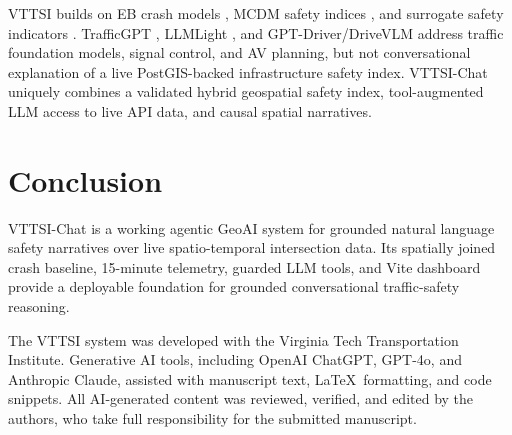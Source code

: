 \documentclass[sigconf]{acmart}
\begin{document}
VTTSI builds on EB crash models \cite{persaud2007,montella2020systemic},
MCDM safety indices \cite{Amraji2025CombinedSafetyIndex,asadamraji2025combined},
and surrogate safety indicators \cite{schultz2025_surrogate,gettman2003ssam}.
TrafficGPT \cite{trafficgpt2023}, LLMLight \cite{llmlight2024}, and
GPT-Driver/DriveVLM \cite{gptdriver2023,drivevlm2024} address traffic
foundation models, signal control, and AV planning, but not conversational
explanation of a live PostGIS-backed infrastructure safety index.
VTTSI-Chat uniquely combines a validated hybrid geospatial safety index,
tool-augmented LLM access to live API data, and causal spatial narratives.

\section{Conclusion}
\label{sec:conclusion}

VTTSI-Chat is a working agentic GeoAI system for grounded natural language
safety narratives over live spatio-temporal intersection data.
Its spatially joined crash baseline, 15-minute telemetry, guarded LLM tools,
and Vite dashboard provide a deployable foundation for grounded conversational
traffic-safety reasoning.

\begin{acks}
The VTTSI system was developed with the Virginia Tech Transportation
Institute. Generative AI tools, including OpenAI ChatGPT, GPT-4o, and
Anthropic Claude, assisted with manuscript text, \LaTeX\ formatting, and
code snippets. All AI-generated content was reviewed, verified, and edited
by the authors, who take full responsibility for the submitted manuscript.
\end{acks}



\end{document}
